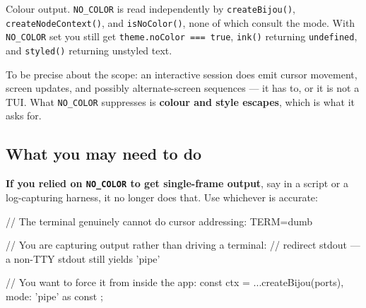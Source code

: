 Colour output. \texttt{N\allowbreak{}O\allowbreak{}\_\allowbreak{}C\allowbreak{}O\allowbreak{}L\allowbreak{}O\allowbreak{}R} is read independently by \texttt{c\allowbreak{}r\allowbreak{}e\allowbreak{}a\allowbreak{}t\allowbreak{}e\allowbreak{}B\allowbreak{}i\allowbreak{}j\allowbreak{}o\allowbreak{}u\allowbreak{}(\allowbreak{})}, \texttt{c\allowbreak{}r\allowbreak{}e\allowbreak{}a\allowbreak{}t\allowbreak{}e\allowbreak{}N\allowbreak{}o\allowbreak{}d\allowbreak{}e\allowbreak{}C\allowbreak{}o\allowbreak{}n\allowbreak{}t\allowbreak{}e\allowbreak{}x\allowbreak{}t\allowbreak{}(\allowbreak{})}, and \texttt{i\allowbreak{}s\allowbreak{}N\allowbreak{}o\allowbreak{}C\allowbreak{}o\allowbreak{}l\allowbreak{}o\allowbreak{}r\allowbreak{}(\allowbreak{})}, none of which consult the mode. With \texttt{N\allowbreak{}O\allowbreak{}\_\allowbreak{}C\allowbreak{}O\allowbreak{}L\allowbreak{}O\allowbreak{}R} set you still get \texttt{t\allowbreak{}h\allowbreak{}e\allowbreak{}m\allowbreak{}e\allowbreak{}.\allowbreak{}n\allowbreak{}o\allowbreak{}C\allowbreak{}o\allowbreak{}l\allowbreak{}o\allowbreak{}r\allowbreak{} \allowbreak{}=\allowbreak{}=\allowbreak{}=\allowbreak{} \allowbreak{}t\allowbreak{}r\allowbreak{}u\allowbreak{}e}, \texttt{i\allowbreak{}n\allowbreak{}k\allowbreak{}(\allowbreak{})} returning \texttt{u\allowbreak{}n\allowbreak{}d\allowbreak{}e\allowbreak{}f\allowbreak{}i\allowbreak{}n\allowbreak{}e\allowbreak{}d}, and \texttt{s\allowbreak{}t\allowbreak{}y\allowbreak{}l\allowbreak{}e\allowbreak{}d\allowbreak{}(\allowbreak{})} returning unstyled text.

To be precise about the scope: an interactive session does emit cursor movement, screen updates, and possibly alternate-screen sequences --- it has to, or it is not a TUI. What \texttt{N\allowbreak{}O\allowbreak{}\_\allowbreak{}C\allowbreak{}O\allowbreak{}L\allowbreak{}O\allowbreak{}R} suppresses is \textbf{colour and style escapes}, which is what it asks for.

\subsection{What you may need to do}\label{record-273-what-you-may-need-to-do}

\textbf{If you relied on \texttt{N\allowbreak{}O\allowbreak{}\_\allowbreak{}C\allowbreak{}O\allowbreak{}L\allowbreak{}O\allowbreak{}R} to get single-frame output}, say in a script or a log-capturing harness, it no longer does that. Use whichever is accurate:

\begin{CodeBlock}
// The terminal genuinely cannot do cursor addressing:
TERM=dumb

// You are capturing output rather than driving a terminal:
//   redirect stdout — a non-TTY stdout still yields 'pipe'

// You want to force it from inside the app:
const ctx = { ...createBijou(ports), mode: 'pipe' as const };
\end{CodeBlock}


